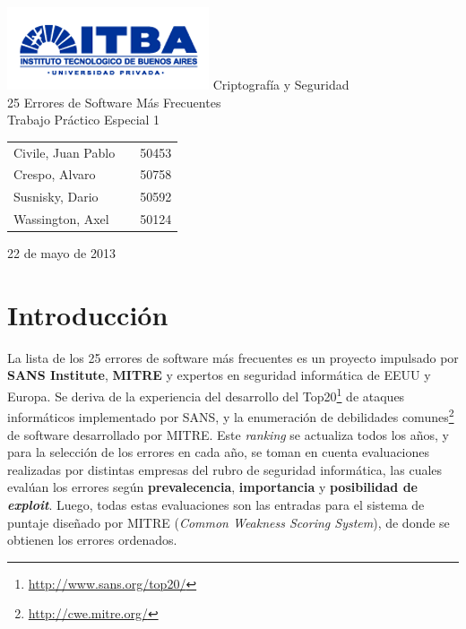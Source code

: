 \documentclass[a4paper,10pt]{article}
\begin{document}
\setcounter{secnumdepth}{5}
\setcounter{tocdepth}{5}

\begin{titlepage}
        \vfill
        \thispagestyle{empty}
        \begin{center}
                \includegraphics{./images/itba_logo.png}
                \vfill
                \Huge{Criptografía y Seguridad}\\
                \vspace{1cm}
                \Huge{25 Errores de Software Más Frecuentes}\\
                \vspace{1cm}
                \Huge{Trabajo Pr\'actico Especial 1}\\
        \end{center}
        \vfill
        \large{
        \begin{tabular}{lcr}
                Civile, Juan Pablo && 50453\\
                Crespo, Alvaro && 50758 \\
                Susnisky, Dario && 50592\\
                Wassington, Axel && 50124\\
        \end{tabular}
}
        \vspace{2cm}
        \begin{center}
                \large{22 de mayo de 2013}\\
        \end{center}
\end{titlepage}
\newpage

\setcounter{page}{1}

\section{Introducción}
La lista de los 25 errores de software más frecuentes es un proyecto impulsado por \textbf{SANS Institute}, \textbf{MITRE} y expertos en seguridad informática de EEUU
y Europa. Se deriva de la experiencia del desarrollo del Top20\footnote{\url{http://www.sans.org/top20/}} de ataques informáticos
implementado por SANS, y la enumeración de debilidades comunes\footnote{\url{http://cwe.mitre.org/}} de software
desarrollado por MITRE. Este \emph{ranking} se actualiza todos los años, y para la selección de los errores en cada año,
se toman en cuenta evaluaciones realizadas por distintas empresas del rubro de seguridad informática, las cuales evalúan
los errores según \textbf{prevalecencia}, \textbf{importancia} y \textbf{posibilidad de \emph{exploit}}. Luego, todas estas
evaluaciones son las entradas para el sistema de puntaje diseñado por MITRE (\emph{Common Weakness Scoring System}), de donde se obtienen los
errores ordenados.\\
\end{document}
